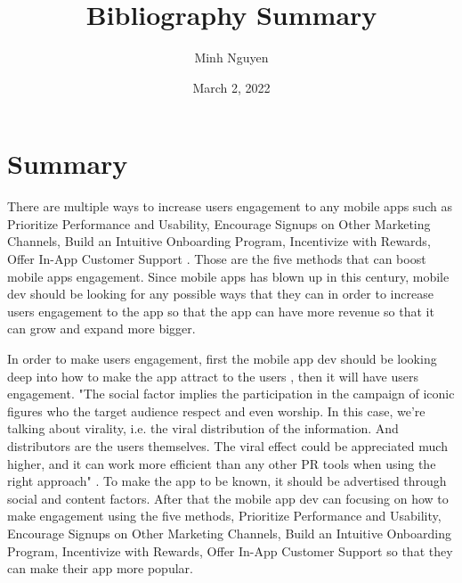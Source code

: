 \documentclass{article}
\title{Bibliography Summary}
\author{Minh Nguyen}
\date{March 2, 2022}
\begin{document}
\maketitle

\section*{Summary}
There are multiple ways to increase users engagement to any mobile apps such as Prioritize Performance and Usability, Encourage Signups on Other Marketing Channels, Build an Intuitive Onboarding Program, Incentivize with Rewards, Offer In-App Customer Support \cite{syed21}. Those are the five methods that can boost mobile apps engagement. Since mobile apps has blown up in this century, mobile dev should be looking for any possible ways that they can in order to increase users engagement to the app so that the app can have more revenue so that it can grow and expand more bigger.

\medskip

In order to make users engagement, first the mobile app dev should be looking deep into how to make the app attract to the users \cite{helen21}, then it will have users engagement. "The social factor implies the participation in the campaign of iconic figures who the target audience respect and even worship. In this case, we’re talking about virality, i.e. the viral distribution of the information. And distributors are the users themselves. The viral effect could be appreciated much higher, and it can work more efficient than any other PR tools when using the right approach" \cite{helen21}. To make the app to be known, it should be advertised through social and content factors. After that the mobile app dev can focusing on how to make engagement using the five methods, Prioritize Performance and Usability, Encourage Signups on Other Marketing Channels, Build an Intuitive Onboarding Program, Incentivize with Rewards, Offer In-App Customer Support so that they can make their app more popular.

\printbibliography
\end{document}
